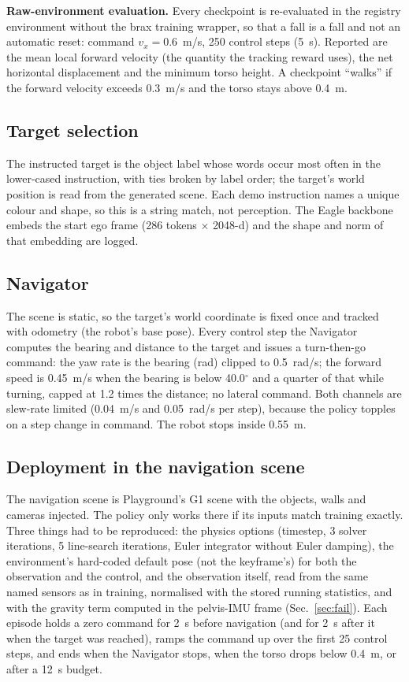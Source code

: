 \documentclass[conference,10pt]{IEEEtran}
\begin{document}
\textbf{Raw-environment evaluation.} Every checkpoint is re-evaluated in the registry environment without the brax
training wrapper, so that a fall is a fall and not an automatic reset: command $v_x = 0.6$~m/s, 250 control steps
(5~s). Reported are the mean local forward velocity (the quantity the tracking reward uses), the net horizontal
displacement and the minimum torso height. A checkpoint ``walks'' if the forward velocity exceeds 0.3~m/s and the
torso stays above 0.4~m.

\subsection{Target selection}\label{sec:select}
The instructed target is the object label whose words occur most often in the lower-cased instruction, with ties broken
by label order; the target's world position is read from the generated scene. Each demo instruction names a unique
colour and shape, so this is a string match, not perception. The Eagle backbone embeds the start ego frame (286 tokens
$\times$ 2048-d) and the shape and norm of that embedding are logged.

\subsection{Navigator}\label{sec:nav}
The scene is static, so the target's world coordinate is fixed once and tracked with odometry (the robot's base pose).
Every control step the Navigator computes the bearing and distance to the target and issues a turn-then-go command: the
yaw rate is the bearing (rad) clipped to 0.5~rad/s; the forward speed is 0.45~m/s when the bearing is below 40.0$^\circ$ and
a quarter of that while turning, capped at 1.2 times the distance; no lateral command. Both channels are slew-rate
limited (0.04~m/s and 0.05~rad/s per step), because the policy topples on a step change in command. The robot stops
inside 0.55~m.

\subsection{Deployment in the navigation scene}\label{sec:deploy}
The navigation scene is Playground's G1 scene with the objects, walls and cameras injected. The policy only works there
if its inputs match training exactly. Three things had to be reproduced: the physics options (timestep, 3 solver
iterations, 5 line-search iterations, Euler integrator without Euler damping), the environment's hard-coded default
pose (not the keyframe's) for both the observation and the control, and the observation itself, read from the same
named sensors as in training, normalised with the stored running statistics, and with the gravity term computed in the
pelvis-IMU frame (Sec.~\ref{sec:fail}). Each episode holds a zero command for 2~s before navigation (and for 2~s after it when the target was reached),
ramps the command up over the first 25 control steps, and ends when the Navigator stops, when the torso drops below 0.4~m, or after
a 12~s budget.
\end{document}
